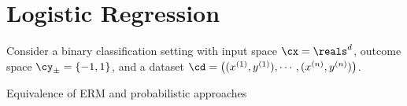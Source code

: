 \documentclass{article}
\newcommand{\nyuparagraph}[1]{\textcolor{nyupurple}{\large #1}}
\theoremstyle{plain}
\theoremstyle{definition}
\begin{document}


\section{Logistic Regression}
\label{sec:lr}
Consider a binary classification setting with input
space $\cx=\reals^{d}$, outcome space $\cy_{\pm}=\left\{ -1,1\right\} $,
and a dataset $\cd=\left((x^{(1)},y^{(1)}),\cdots,(x^{(n)},y^{(n)})\right)$.

\vspace{0.3in}
\nyuparagraph{\label{subsec:erm-bernoulli-setup}Equivalence of ERM and probabilistic
approaches}
\end{document}
